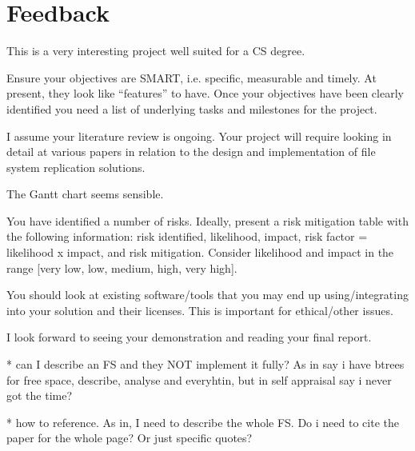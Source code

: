 \documentclass[a4paper]{report}
\begin{document}
    \section{Feedback}
        This is a very interesting project well suited for a CS degree.

        Ensure your objectives are SMART, i.e. specific, measurable and timely.
        At present, they look like “features” to have. Once your objectives
        have been clearly identified you need a list of underlying tasks and
        milestones for the project.

        I assume your literature review is ongoing. Your project will require
        looking in detail at various papers in relation to the design and
        implementation of file system replication solutions.

        The Gantt chart  seems sensible.

        You have identified a number of risks. Ideally, present a risk
        mitigation table with the following information: risk identified,
        likelihood, impact, risk factor = likelihood x impact, and risk
        mitigation. Consider likelihood and impact in the range [very low, low,
        medium, high, very high].

        You should look at existing software/tools that you may end up
        using/integrating into your solution and their licenses. This is
        important for ethical/other issues.

        I look forward to seeing your demonstration and reading your final
        report.



        * can I describe an FS and they NOT implement it fully? As in say i
          have btrees for free space, describe, analyse and everyhtin, but in
          self appraisal say i never got the time?

        * how to reference. As in, I need to describe the whole FS. Do i need
          to cite the paper for the whole page? Or just specific quotes?
\end{document}
